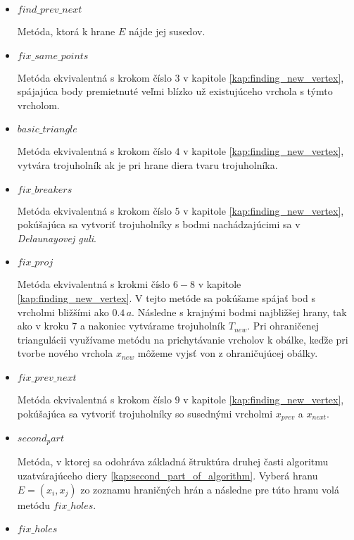 \begin{itemize}
{\begin{itemize}
{                Metóda, ktorá vypočíta bod $x_{new}$ pre hraničnú hranu $E$.
            }
            \item{
                $find\_prev\_next$

                Metóda, ktorá k hrane $E$ nájde jej susedov. 
            }
            \item{
                $fix\_same\_points$

                Metóda ekvivalentná s krokom číslo $3$ v kapitole \ref{kap:finding_new_vertex}, 
                spájajúca body premietnuté veľmi blízko už existujúceho vrchola s týmto vrcholom.
            }
            \item{
                $basic\_triangle$

                Metóda ekvivalentná s krokom číslo $4$ v kapitole \ref{kap:finding_new_vertex},
                vytvára trojuholník ak je pri hrane diera tvaru trojuholníka.
            }
            \item{
                $fix\_breakers$

                Metóda ekvivalentná s krokom číslo $5$ v kapitole \ref{kap:finding_new_vertex},
                pokúšajúca sa vytvoriť trojuholníky s bodmi nachádzajúcimi sa v 
                \textit{Delaunayovej guli}.
            }
            \item{
                $fix\_proj$

                Metóda ekvivalentná s krokmi číslo $6-8$ v kapitole \ref{kap:finding_new_vertex}.
                V tejto metóde sa pokúšame spájať bod s vrcholmi bližšími ako $0.4 \, a$. Následne 
                s krajnými bodmi najbližšej hrany, tak ako v kroku $7$ a nakoniec vytvárame 
                trojuholník $T_{new}$. Pri ohraničenej triangulácii využívame
                metódu na prichytávanie vrcholov
                k obálke, keďže pri tvorbe nového vrchola $x_{new}$ môžeme vyjsť von z 
                ohraničujúcej obálky.
            }
            \item{
                $fix\_prev\_next$

                Metóda ekvivalentná s krokom číslo $9$ v kapitole \ref{kap:finding_new_vertex},
                pokúšajúca sa vytvoriť trojuholníky so susednými vrcholmi $x_{prev}$ a $x_{next}$.
            }
            \item{
                $second_part$

                Metóda, v ktorej sa odohráva základná štruktúra druhej časti algoritmu uzatvárajúceho
                diery \ref{kap:second_part_of_algorithm}. Vyberá hranu $E=(x_i, x_j)$ zo zoznamu hraničných 
                hrán a následne pre túto hranu volá metódu $fix\_holes$.
            }
            \item{
                $fix\_holes$

}
\end{itemize}}
\end{itemize}
